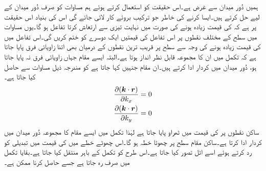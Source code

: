 ہمیں دُور میدان سے غرض ہے۔اس حقیقت کو استعمال کرتے ہوئے ہم  مساوات  کو صرف دُور میدان کے لیے حل کرتے ہیں۔ایسا کرنے کی خاطر جو ترکیب بروئے کار لائی جائے گی اس کی بنیاد اس حقیقت پر ہے کہ  کی قیمت زیادہ ہونے کی صورت میں   نہایت تیزی سے ارتعاش کرتا تفاعل ہو گا۔یوں مساوات  میں  سطح کے مختلف نقطوں پر اس تفاعل کی قیمتیں ایک دوسرے کو ختم کریں گی۔اس تفاعل میں  کی قیمت زیادہ ہونے کی وجہ سے   سطح پر قریب ترین  نقطوں کے درمیان بھی اتنا زاویائی فرق  پایا جاتا ہے کہ تکمل میں ان کا مجموعہ قابل نظر انداز ہوتا ہے۔البتہ ایسے مقام جہاں زاویائی فرق نہ پایا جاتا ہو،  دُور میدان میں کردار ادا کرتے ہیں۔ان مقام جنہیں  کہا جاتا ہے کو مندرجہ ذیل مساوات سے حاصل کیا جاتا ہے۔
\begin{gather}
  \begin{aligned}\label{مساوات_اینٹینا_ساکن_نقطے}
\frac{\partial ({{\boldsymbol{k}}}\cdot {\ensuremath{{\boldsymbol{r}}}})}{\partial k_x}&=0\\
\frac{\partial ({{\boldsymbol{k}}}\cdot {\ensuremath{{\boldsymbol{r}}}})}{\partial k_y}&=0
\end{aligned}
\end{gather}
ساکن نقطوں پر  کی قیمت میں ٹھراو پایا جاتا ہے لہٰذا تکمل میں ایسے مقام کا مجموعہ دُور میدان میں کردار ادا کرتا ہے۔ساکن مقام  سطح پر چھوٹا خطہ ہو گا۔اس چھوٹے خطے  میں  کی قیمت میں تبدیلی کو رد کرتے ہوئے اسے اٹل تصور کیا جاتا ہے۔اس طرح   کو تکمل کے باہر منتقل کیا جاتا ہے۔بقایا تکمل میں صرف  رہ جاتا ہے جسے حاصل کرنا ممکن ہے۔

